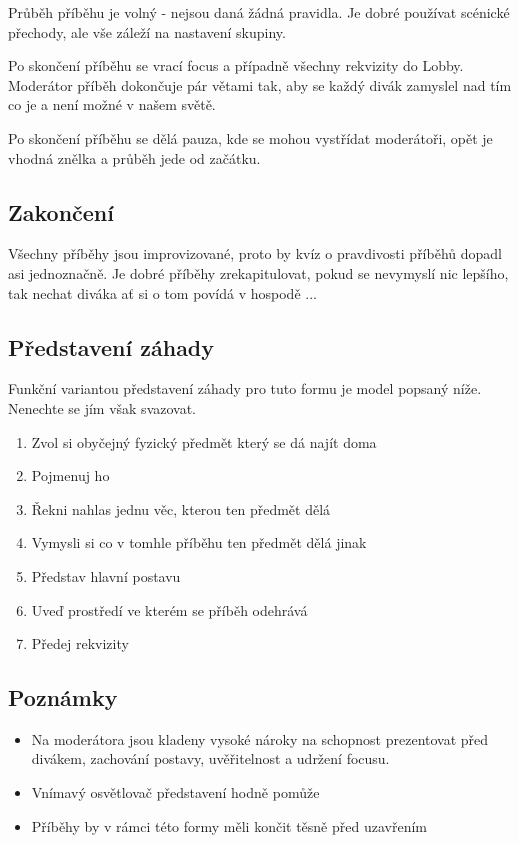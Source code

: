 \documentclass[main.tex]{subfiles}
\begin{document}
Průběh příběhu je volný - nejsou daná žádná pravidla. Je dobré používat scénické přechody, ale vše záleží na nastavení skupiny. 
 
Po skončení příběhu se vrací focus a případně všechny rekvizity do Lobby. Moderátor příběh dokončuje pár větami tak, aby se každý divák zamyslel nad tím co je a není možné v našem světě.  
 
Po skončení příběhu se dělá pauza, kde se mohou vystřídat moderátoři, opět je vhodná znělka a průběh jede od začátku. 
 
\subsection{ Zakončení }  
Všechny příběhy jsou improvizované, proto by kvíz o pravdivosti příběhů dopadl asi jednoznačně. Je dobré příběhy zrekapitulovat, pokud se nevymyslí nic lepšího, tak nechat diváka ať si o tom povídá v hospodě ... 
 
\subsection{ Představení záhady }  
Funkční variantou představení záhady pro tuto formu je model popsaný níže. Nenechte se jím však svazovat. 
 
\begin{enumerate}
\item  Zvol si obyčejný fyzický předmět který se dá najít doma
\item  Pojmenuj ho
\item  Řekni nahlas jednu věc, kterou ten předmět dělá
\item  Vymysli si co v tomhle příběhu ten předmět dělá jinak
\item  Představ hlavní postavu
\item  Uveď prostředí ve kterém se příběh odehrává
\item  Předej rekvizity
\end{enumerate}
 
\subsection{ Poznámky } \begin{itemize}
\item  Na moderátora jsou kladeny vysoké nároky na schopnost prezentovat před divákem, zachování postavy, uvěřitelnost a udržení focusu.
\item  Vnímavý osvětlovač představení hodně pomůže
\item  Příběhy by v rámci této formy měli končit těsně před uzavřením
\end{itemize}
 
 
\end{document}
